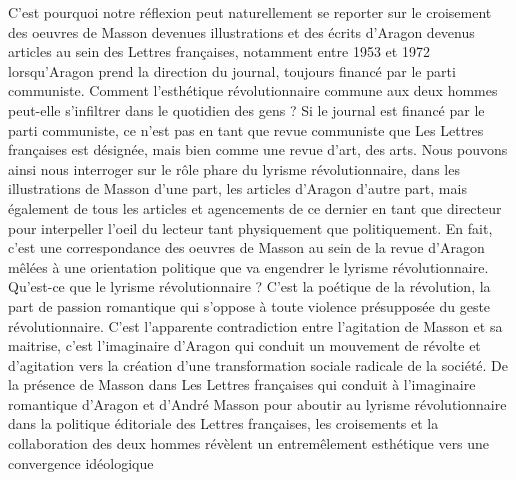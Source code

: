 	 C’est pourquoi notre réflexion peut naturellement se reporter sur le croisement des oeuvres de Masson devenues illustrations et des écrits d’Aragon devenus articles au sein des Lettres françaises, notamment entre 1953 et 1972 lorsqu’Aragon prend la direction du journal, toujours  financé par le parti communiste. Comment l’esthétique révolutionnaire commune aux deux hommes peut-elle s’infiltrer dans le quotidien des gens ? Si le journal est financé par le parti communiste, ce n’est pas en tant que revue communiste que Les Lettres françaises est désignée, mais bien comme une revue d’art, des arts. Nous pouvons ainsi nous interroger sur le rôle phare du lyrisme révolutionnaire, dans les illustrations de Masson d’une part, les articles d’Aragon d’autre part, mais également de tous les articles et agencements de ce dernier en tant que directeur pour interpeller l’oeil du lecteur tant physiquement que politiquement. En fait, c’est une correspondance des oeuvres de Masson au sein de la revue d’Aragon mêlées à une orientation politique que va engendrer le lyrisme révolutionnaire. Qu’est-ce que le lyrisme révolutionnaire ? C’est la poétique de la révolution, la part de passion romantique qui s’oppose à toute violence présupposée du geste révolutionnaire. C’est l’apparente contradiction entre l’agitation de Masson et sa maitrise, c’est l’imaginaire d’Aragon qui conduit un mouvement de révolte et d’agitation vers la création d’une transformation sociale radicale de la société. De la présence de Masson dans Les Lettres françaises qui conduit à l’imaginaire romantique d’Aragon et d’André Masson pour aboutir au lyrisme révolutionnaire dans la politique éditoriale des Lettres françaises, les croisements et la collaboration des deux hommes révèlent un entremêlement esthétique vers une convergence idéologique

     